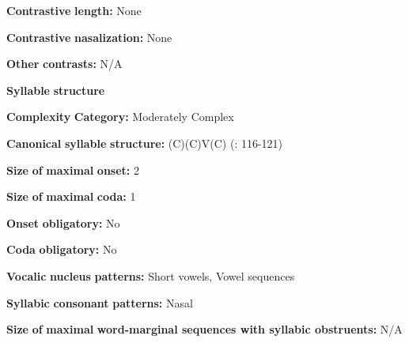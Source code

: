 \begin{styleBody}
\textbf{Contrastive} \textbf{length:} None
\end{styleBody}

\begin{styleBody}
\textbf{Contrastive} \textbf{nasalization:} None
\end{styleBody}

\begin{styleBody}
\textbf{Other} \textbf{contrasts:} N/A
\end{styleBody}

\begin{styleBody}
\textbf{Syllable} \textbf{structure}
\end{styleBody}

\begin{styleBody}
\textbf{Complexity} \textbf{Category:} Moderately Complex
\end{styleBody}

\begin{styleBody}
\textbf{Canonical} \textbf{syllable} \textbf{structure:} (C)(C)V(C) (\citealt{SandersSanders1980}: 116-121)
\end{styleBody}

\begin{styleBody}
\textbf{Size} \textbf{of} \textbf{maximal} \textbf{onset:} 2
\end{styleBody}

\begin{styleBody}
\textbf{Size} \textbf{of} \textbf{maximal} \textbf{coda:} 1
\end{styleBody}

\begin{styleBody}
\textbf{Onset} \textbf{obligatory:} No
\end{styleBody}

\begin{styleBody}
\textbf{Coda} \textbf{obligatory:} No
\end{styleBody}

\begin{styleBody}
\textbf{Vocalic} \textbf{nucleus} \textbf{patterns:} Short vowels, Vowel sequences
\end{styleBody}

\begin{styleBody}
\textbf{Syllabic} \textbf{consonant} \textbf{patterns:} Nasal
\end{styleBody}

\begin{styleBody}
\textbf{Size} \textbf{of} \textbf{maximal} \textbf{word{}-marginal sequences with syllabic obstruents:} N/A
\end{styleBody}


